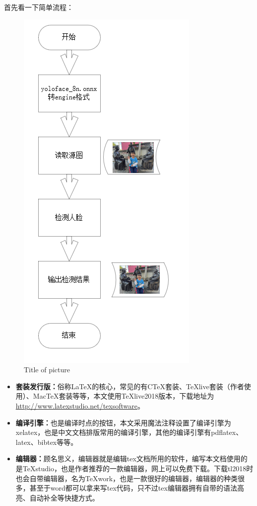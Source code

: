 \begin{itemize}
首先看一下简单流程：\begin{figure}[H]
    \centering
    \includegraphics{figures/progress.png}
    \caption{Title of picture}
    \end{figure}





\begin{itemize}
\item \textbf{套装发行版：}俗称\LaTeX 的核心，常见的有CTeX套装、TeXlive套装（作者使用）、MacTeX套装等等，本文使用TeXlive2018版本，下载地址为\url{http://www.latexstudio.net/texsoftware}。

\item \textbf{编译引擎：}也是编译时点的按钮，本文采用魔法注释设置了编译引擎为xelatex，也是中文文档排版常用的编译引擎，其他的编译引擎有pdflatex、latex、bibtex等等。
 
\item \textbf{编辑器：}顾名思义，编辑器就是编辑tex文档所用的软件，编写本文档使用的是TeXstudio，也是作者推荐的一款编辑器，网上可以免费下载。下载tl2018时也会自带编辑器，名为TeXwork，也是一款很好的编辑器，编辑器的种类很多，甚至于word都可以拿来写tex代码，只不过tex编辑器拥有自带的语法高亮、自动补全等快捷方式。
\end{itemize}


\end{itemize}
